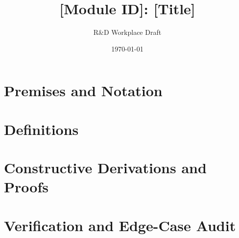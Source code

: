 \documentclass[11pt,a4paper]{article}
\title{\textbf{[Module ID]: [Title]}}
\author{R\&D Workplace Draft}
\date{\today}
\theoremstyle{definition}
\theoremstyle{plain}
\theoremstyle{remark}
\begin{document}
\maketitle

\section{Premises and Notation}

\section{Definitions}

\section{Constructive Derivations and Proofs}

\section{Verification and Edge-Case Audit}
\end{document}
